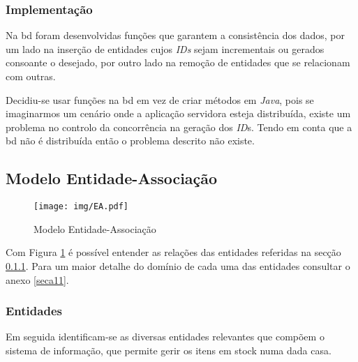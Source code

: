 \subsubsection{Implementação}\label{subsubsec3111}

Na \acrshort{bd} foram desenvolvidas funções que garantem a consistência dos dados, por um lado na inserção de entidades cujos \textit{IDs} sejam incrementais ou gerados consoante o desejado, por outro lado na remoção  de entidades que se relacionam com outras.

Decidiu-se usar funções na \acrshort{bd} em vez de criar métodos em \textit{Java}, pois se imaginarmos um cenário onde a aplicação servidora esteja distribuída, existe um problema no controlo da concorrência na geração dos \textit{ID}s. Tendo em conta que a \acrshort{bd} não é distribuída então o problema descrito não existe.

\subsection{Modelo Entidade-Associação}\label{subsec312}

\begin{figure}[H]
	\centering
	\texttt{[image: img/EA.pdf]}
	\caption{Modelo Entidade-Associação}
	\label{modelo-ea}
\end{figure}

Com Figura \ref{modelo-ea} é possível entender as relações das entidades referidas na secção \ref{subsubsec3121}. Para um maior detalhe do domínio de cada uma das entidades consultar o anexo \ref{seca11}.

\subsubsection{Entidades} \label{subsubsec3121}

Em seguida identificam-se as diversas entidades relevantes que compõem o sistema de informação, que permite gerir os itens em stock numa dada casa.
